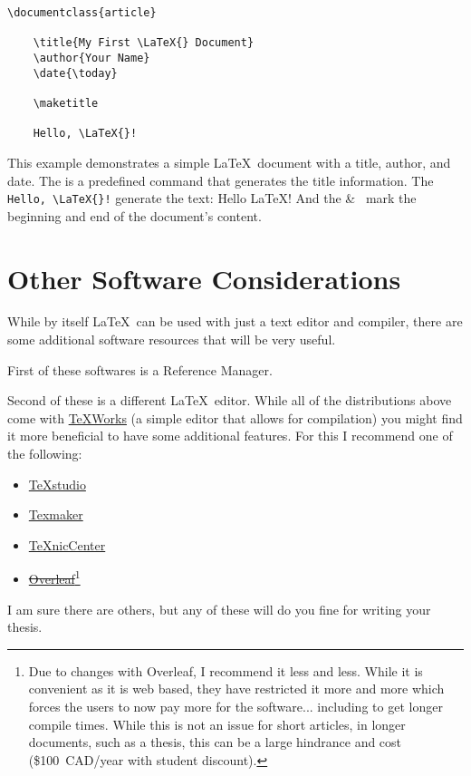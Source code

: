 		\begin{lstlisting}[style=LaTeXStyle]
\documentclass{article}

    \title{My First \LaTeX{} Document}
    \author{Your Name}
    \date{\today}
    
    \maketitle
    
    Hello, \LaTeX{}!

		\end{lstlisting}
		This example demonstrates a simple \LaTeX\ document with a title, author, and date. 
		The  is a predefined command that generates the title information.
		The \lstinline|Hello, \LaTeX{}!| generate the text: Hello \LaTeX!
		And the  \&\  mark the beginning and end of the document's content.

	\section{Other Software Considerations}
		While by itself \LaTeX\ can be used with just a text editor and compiler, there are some additional software resources that will be very useful.
		
		First of these softwares is a Reference Manager.
		
		
		Second of these is a different \LaTeX\ editor.
		While all of the distributions above come with \href{https://www.tug.org/texworks/}{TeXWorks} (a simple editor that allows for compilation) you might find it more beneficial to have some additional features.
		For this I recommend one of the following:
		\begin{itemize}
			\item \href{https://www.texstudio.org/}{TeXstudio}
			\item \href{http://www.xm1math.net/texmaker/}{Texmaker}
			\item \href{http://www.texniccenter.org/}{TeXnicCenter}
			\item \href{https://www.overleaf.com/}{\sout{Overleaf}}\footnote{Due to changes with Overleaf, I recommend it less and less. While it is convenient as it is web based, they have restricted it more and more which forces the users to now pay more for the software... including to get longer compile times. While this is not an issue for short articles, in longer documents, such as a thesis, this can be a large hindrance and cost (\$100~CAD/year with student discount).}
		\end{itemize}
		I am sure there are others, but any of these will do you fine for writing your thesis.